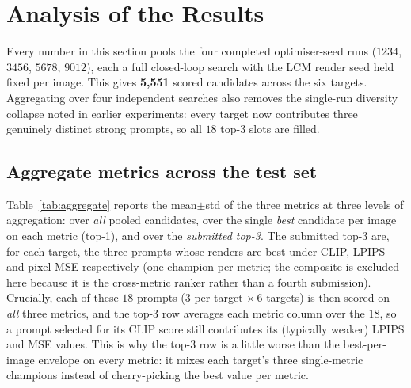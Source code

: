 \documentclass[runningheads]{llncs}
\begin{document}
\section{Analysis of the Results}
\label{sec:results}

Every number in this section pools the four completed optimiser-seed runs ($1234$, $3456$, $5678$, $9012$), each a full closed-loop search with the LCM render seed held fixed per image. This gives \textbf{5{,}551} scored candidates across the six targets. Aggregating over four independent searches also removes the single-run diversity collapse noted in earlier experiments: every target now contributes three genuinely distinct strong prompts, so all $18$ top-3 slots are filled.

\subsection{Aggregate metrics across the test set}
Table~\ref{tab:aggregate} reports the mean$\pm$std of the three metrics at three levels of aggregation: over \emph{all} pooled candidates, over the single \emph{best} candidate per image on each metric (top-1), and over the \emph{submitted top-3}. The submitted top-3 are, for each target, the three prompts whose renders are best under CLIP, LPIPS and pixel MSE respectively (one champion per metric; the composite is excluded here because it is the cross-metric ranker rather than a fourth submission). Crucially, each of these $18$ prompts ($3$ per target $\times\,6$ targets) is then scored on \emph{all} three metrics, and the top-3 row averages each metric column over the $18$, so a prompt selected for its CLIP score still contributes its (typically weaker) LPIPS and MSE values. This is why the top-3 row is a little worse than the best-per-image envelope on every metric: it mixes each target's three single-metric champions instead of cherry-picking the best value per metric.
\end{document}

